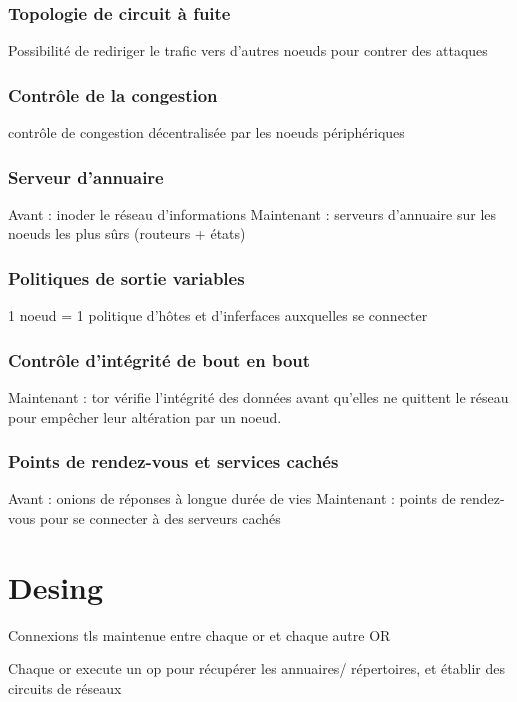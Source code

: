 \documentclass[12pt]{article}
\begin{document}
\subsubsection{Topologie de circuit à fuite}
Possibilité de rediriger le trafic vers d'autres noeuds pour contrer des attaques

\subsubsection{Contrôle de la congestion}
contrôle de congestion décentralisée par les noeuds périphériques
\subsubsection{Serveur d'annuaire}
Avant : inoder le réseau d'informations
Maintenant : serveurs d'annuaire sur les noeuds les plus sûrs (routeurs + états)

\subsubsection{Politiques de sortie variables}
1 noeud = 1 politique d'hôtes et d'inferfaces auxquelles se connecter

\subsubsection{Contrôle d'intégrité de bout en bout}
Maintenant : \acrshort{tor} vérifie l'intégrité des données avant qu'elles ne quittent le réseau pour empêcher leur altération par un noeud.

\subsubsection{Points de rendez-vous et services cachés}
Avant : onions de réponses à longue durée de vies
Maintenant : points de rendez-vous pour se connecter à des serveurs cachés 

\section{}
\section{Desing}

Connexions \acrshort{tls} maintenue entre chaque \acrshort{or} et chaque autre OR

Chaque \acrshort{or} execute un \acrshort{op} pour récupérer les annuaires/ répertoires, et établir des circuits de réseaux
\end{document}
